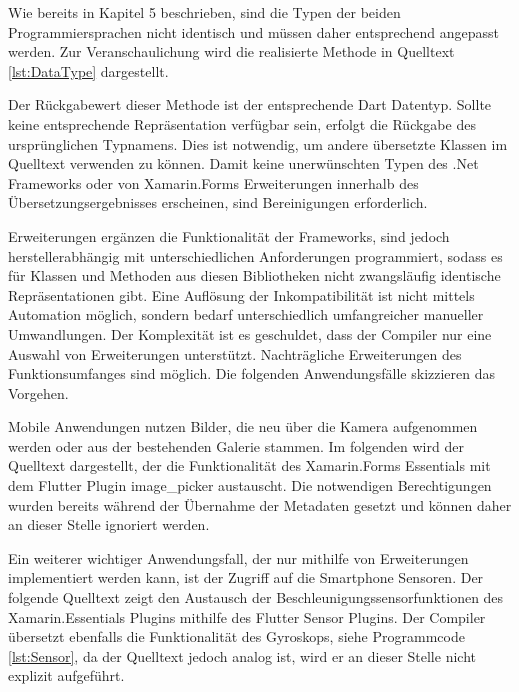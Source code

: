 

Wie bereits in Kapitel 5 beschrieben,  sind die Typen der beiden Programmiersprachen nicht identisch und müssen daher entsprechend angepasst werden.  Zur Veranschaulichung wird die realisierte Methode in Quelltext \ref{lst:DataType} dargestellt. 


Der Rückgabewert dieser Methode ist der entsprechende Dart Datentyp.  Sollte keine entsprechende Repräsentation verfügbar sein,  erfolgt die Rückgabe des ursprünglichen Typnamens.  Dies ist notwendig,  um andere übersetzte Klassen im Quelltext verwenden zu können.  Damit keine unerwünschten Typen des .Net Frameworks oder von Xamarin.Forms Erweiterungen innerhalb des Übersetzungsergebnisses erscheinen, sind Bereinigungen erforderlich. 

Erweiterungen ergänzen die Funktionalität der Frameworks,  sind jedoch herstellerabhängig mit unterschiedlichen Anforderungen programmiert,  sodass es für Klassen und Methoden aus diesen Bibliotheken nicht zwangsläufig identische Repräsentationen gibt.  Eine Auflösung der Inkompatibilität ist nicht mittels Automation möglich, sondern bedarf unterschiedlich umfangreicher manueller Umwandlungen.  Der Komplexität ist es geschuldet,  dass der Compiler nur eine Auswahl von Erweiterungen unterstützt.  Nachträgliche Erweiterungen des Funktionsumfanges sind möglich.  Die folgenden Anwendungsfälle skizzieren das Vorgehen.  

Mobile Anwendungen nutzen Bilder, die neu über die Kamera aufgenommen werden oder aus der bestehenden Galerie stammen.  Im folgenden wird der Quelltext dargestellt, der die Funktionalität des Xamarin.Forms Essentials mit dem Flutter Plugin \glq image\_picker\grq{} austauscht.  Die notwendigen Berechtigungen wurden bereits während der Übernahme der Metadaten gesetzt und können daher an dieser Stelle ignoriert werden.



Ein weiterer wichtiger Anwendungsfall,  der nur mithilfe von Erweiterungen implementiert werden kann,  ist der Zugriff auf die Smartphone Sensoren.  Der folgende Quelltext zeigt den Austausch der Beschleunigungssensorfunktionen des Xamarin.Essentials Plugins mithilfe des Flutter Sensor Plugins.  Der Compiler übersetzt ebenfalls die Funktionalität des Gyroskops, siehe Programmcode \ref{lst:Sensor},  da der Quelltext jedoch analog ist, wird er an dieser Stelle nicht explizit aufgeführt. 

